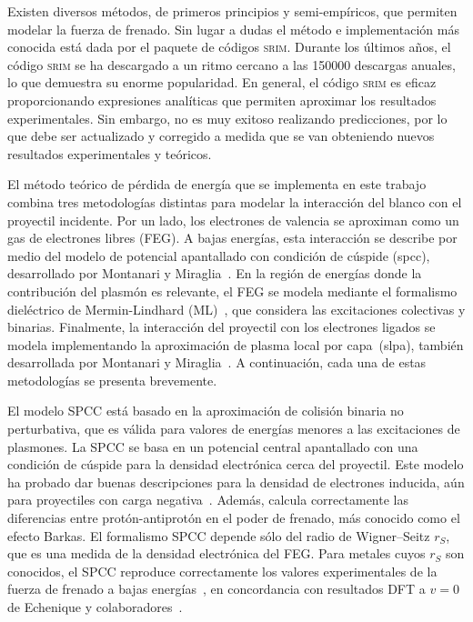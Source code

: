 Existen diversos métodos, de primeros principios y semi-empíricos, que 
permiten modelar la fuerza de frenado. Sin lugar a dudas el método e
implementación más conocida está dada por el paquete de códigos 
\textsc{srim}. Durante los últimos años, el código \textsc{srim} se ha 
descargado a un ritmo cercano a las 150000 descargas anuales, lo que 
demuestra su enorme popularidad. En general, el código \textsc{srim} es 
eficaz proporcionando expresiones analíticas que permiten aproximar los 
resultados experimentales. Sin embargo, no es muy exitoso realizando 
predicciones, por lo que debe ser actualizado y corregido a medida que 
se van obteniendo nuevos resultados experimentales y teóricos. 

El método teórico de pérdida de energía que se implementa en este 
trabajo combina tres metodologías distintas para modelar la interacción 
del blanco con el proyectil incidente. Por un lado, los electrones de 
valencia se aproximan como un gas de electrones libres (FEG). A bajas 
energías, esta interacción se describe por medio del modelo de potencial 
apantallado con condición de cúspide (\acs{spcc}), desarrollado por 
Montanari y Miraglia~\cite{Montanari:17}. En la región de energías donde 
la contribución del plasmón es relevante, el FEG se modela mediante el 
formalismo dieléctrico de Mermin-Lindhard (ML)~\cite{Mermin:70}, que 
considera las excitaciones colectivas y binarias. Finalmente, la 
interacción del proyectil con los electrones ligados se modela 
implementando la aproximación de plasma local por capa~(\acs{slpa}), 
también desarrollada por Montanari y 
Miraglia~\cite{Montanari:17,Montanari:13}. A continuación, cada una de 
estas metodologías se presenta brevemente.

El modelo SPCC está basado en la aproximación de colisión binaria no 
perturbativa, que es válida para valores de energías menores a las 
excitaciones de plasmones. La SPCC se basa en un potencial central 
apantallado con una condición de cúspide para la densidad electrónica 
cerca del proyectil. Este modelo ha probado dar buenas descripciones 
para la densidad de electrones inducida, aún para proyectiles con carga 
negativa~\cite{Montanari:17}. Además, calcula correctamente las 
diferencias entre protón-antiprotón en el poder de frenado, más 
conocido como el efecto Barkas. El formalismo SPCC depende sólo del 
radio de Wigner--Seitz $r_S$, que es una medida de la densidad 
electrónica del FEG. Para metales cuyos $r_S$ son conocidos, el SPCC 
reproduce correctamente los valores experimentales de la fuerza de 
frenado a bajas energías~\cite{Montanari:17}, en concordancia con 
resultados DFT a $v=0$ de Echenique y colaboradores~\cite{Echenique:81,
Nagy:89}.

